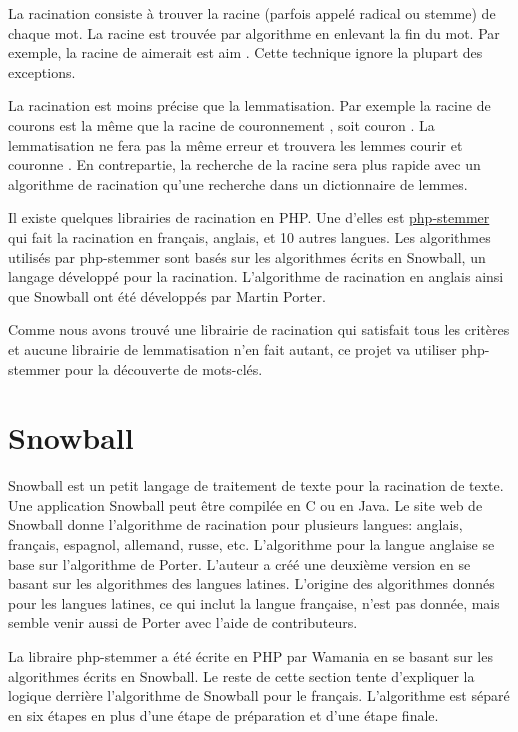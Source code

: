 La racination consiste à trouver la racine (parfois appelé radical ou stemme) de chaque mot.
La racine est trouvée par algorithme en enlevant la fin du mot.
Par exemple, la racine de \og aimerait \fg{} est \og aim \fg{}.
Cette technique ignore la plupart des exceptions.

La racination est moins précise que la lemmatisation.
Par exemple la racine de \og courons \fg{} est la même que la racine de \og couronnement \fg{}, soit \og couron \fg{}.
La lemmatisation ne fera pas la même erreur et trouvera les lemmes \og courir \fg{} et \og couronne \fg{}.
En contrepartie, la recherche de la racine sera plus rapide avec un algorithme de racination qu'une recherche dans un dictionnaire de lemmes.

Il existe quelques librairies de racination en PHP.
Une d'elles est \href{https://github.com/wamania/php-stemmer}{php-stemmer} qui fait la racination en français, anglais, et 10 autres langues.
Les algorithmes utilisés par php-stemmer sont basés sur les algorithmes écrits en Snowball, un langage développé pour la racination.
L'algorithme de racination en anglais ainsi que Snowball ont été développés par Martin Porter.

Comme nous avons trouvé une librairie de racination qui satisfait tous les critères et aucune librairie de lemmatisation n'en fait autant, ce projet va utiliser php-stemmer pour la découverte de mots-clés.

\section{Snowball}

Snowball est un petit langage de traitement de texte pour la racination de texte.
Une application Snowball peut être compilée en C ou en Java.
Le site web de Snowball donne l'algorithme de racination pour plusieurs langues: anglais, français, espagnol, allemand, russe, etc.
L'algorithme pour la langue anglaise se base sur l'algorithme de Porter.
L'auteur a créé une deuxième version en se basant sur les algorithmes des langues latines.
L'origine des algorithmes donnés pour les langues latines, ce qui inclut la langue française, n'est pas donnée, mais semble venir aussi de Porter avec l'aide de contributeurs.

La libraire php-stemmer a été écrite en PHP par Wamania en se basant sur les algorithmes écrits en Snowball.
Le reste de cette section tente d'expliquer la logique derrière l'algorithme de Snowball pour le français.
L'algorithme est séparé en six étapes en plus d'une étape de préparation et d'une étape finale.

